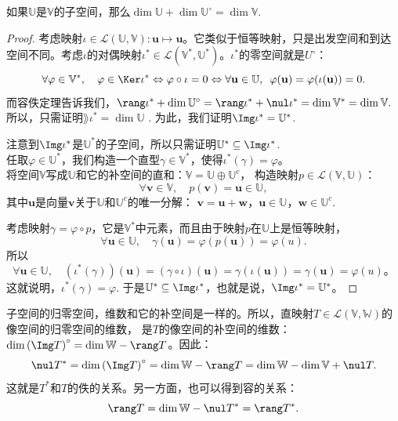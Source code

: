 \documentclass[12pt,UTF8]{ctexbook}
\begin{document}
\begin{pp}\label{pp:3_9}
如果$\mathbb{U}$是$\mathbb{V}$的子空间，那么$\dim\mathbb{U} + \dim\mathbb{U}^\circ = \dim \mathbb{V}.$
\end{pp}
\begin{proof} %
考虑映射$\iota \in \mathcal{L}(\mathbb{U}, \mathbb{V}) : \mathbf{u} \mapsto \mathbf{u}$。它类似于恒等映射，只是出发空间和到达空间不同。考虑$\iota$的对偶映射$\iota^* \in \mathcal{L}(\mathbb{V}^*, \mathbb{U}^*)$。$\iota^*$的零空间就是$U^\circ$：
$$ \forall \varphi \in \mathbb{V}^*, \quad \varphi \in \Ker \iota^* \Leftrightarrow \varphi \circ \iota = 0 \Leftrightarrow \forall \mathbf{u} \in\mathbb{U},\,\,\, \varphi (\mathbf{u}) = \varphi (\iota(\mathbf{u})) = 0.$$
而容佚定理告诉我们，$\rang \iota^* + \dim \mathbb{U}^\circ = \rang \iota^* + \nul \iota^* = \dim \mathbb{V}^* = \dim \mathbb{V}. $ 所以，只需证明$\rang \iota^* = \dim \mathbb{U}$ . 为此，我们证明$\Img \iota^* = \mathbb{U}^*$.

注意到$\Img \iota^*$是$\mathbb{U}^*$的子空间，所以只需证明$\mathbb{U}^* \subseteq \Img \iota^*$. \\
任取$\varphi \in \mathbb{U}^* $，我们构造一个直型$\gamma \in \mathbb{V}^*$，使得$\iota^*(\gamma) = \varphi$。\\
将空间$\mathbb{V}$写成$\mathbb{U}$和它的补空间的直和：$\mathbb{V} = \mathbb{U} \oplus \mathbb{U}^c$，
构造映射$p \in \mathcal{L}(\mathbb{V}, \mathbb{U})$：
$$ \forall  \mathbf{v} \in \mathbb{V}, \quad p(\mathbf{v}) = \mathbf{u} \in \mathbb{U},$$
其中$\mathbf{u}$是向量$\mathbf{v}$关于$\mathbb{U}$和$\mathbb{U}^c$的唯一分解：
$\mathbf{v} = \mathbf{u} + \mathbf{w}$，$\mathbf{u} \in \mathbb{U}$，$\mathbf{w} \in \mathbb{U}^c$.

考虑映射$\gamma = \varphi \circ p$，它是$\mathbb{V}^*$中元素，而且由于映射$p$在$\mathbb{U}$上是恒等映射，
$$ \forall \mathbf{u} \in \mathbb{U}, \quad \gamma(\mathbf{u}) = \varphi(p(\mathbf{u})) = \varphi(u).$$
所以
$$ \forall \mathbf{u} \in \mathbb{U}, \quad (\iota^*(\gamma))(\mathbf{u}) = (\gamma \circ \iota)(\mathbf{u}) = \gamma(\iota(\mathbf{u})) = \gamma(\mathbf{u}) = \varphi(u)。$$
这就说明，$\iota^*(\gamma) = \varphi$. 于是$\mathbb{U}^* \subseteq \Img \iota^*$，也就是说，$\Img \iota^* = \mathbb{U}^*$。
\end{proof}

子空间的归零空间，维数和它的补空间是一样的。所以，直映射$T \in \mathcal{L}(\mathbb{V}, \mathbb{W})$的像空间的归零空间的维数，
是$T$的像空间的补空间的维数：$\dim \left(\Img T\right)^\circ = \dim \mathbb{W} - \rang T$。因此：
$$ \nul T^* = \dim \left(\Img T\right)^\circ = \dim \mathbb{W} - \rang T = \dim \mathbb{W} - \dim \mathbb{V} + \nul T.$$
这就是$T^*$和$T$的佚的关系。另一方面，也可以得到容的关系：
$$ \rang T = \dim \mathbb{W} - \nul T^* =  \rang T^*. $$
\end{document}
